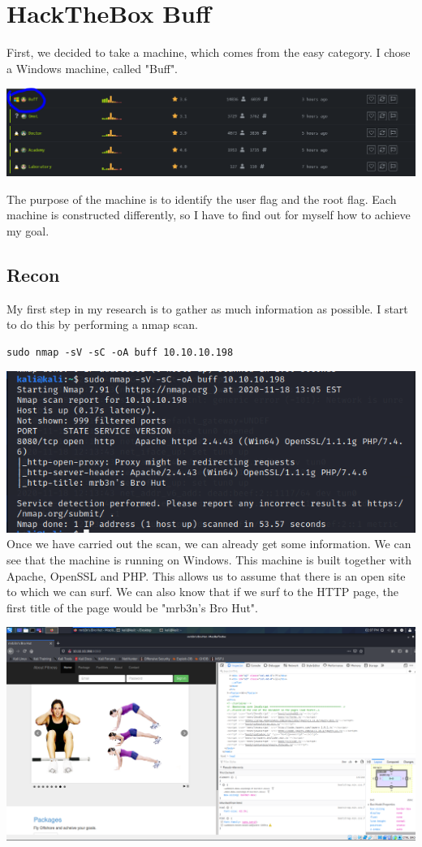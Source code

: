 \documentclass[../main.tex]{subfiles}
\begin{document}
\section{HackTheBox Buff}

First, we decided to take a machine, which comes from the easy category. I chose a Windows machine, called "Buff". 

\includegraphics[width=\linewidth]{images/Boyan/HackTheBox_1_Boyan.PNG}

The purpose of the machine is to identify the user flag and the root flag. Each machine is constructed differently, so I have to find out for myself how to achieve my goal.  

\subsection{Recon}
My first step in my research is to gather as much information as possible. I start to do this by performing a nmap scan. 

\begin{lstlisting}
sudo nmap -sV -sC -oA buff 10.10.10.198
\end{lstlisting}

\includegraphics[width=\linewidth]{images/Boyan/HackTheBox_2_scanning_Boyan.PNG}
Once we have carried out the scan, we can already get some information. We can see that the machine is running on Windows. This machine is built together with Apache, OpenSSL and PHP. This allows us to assume that there is an open site to which we can surf. We can also know that if we surf to the HTTP page, the first title of the page would be "mrb3n's Bro Hut".

\includegraphics[width=\linewidth]{images/Boyan/HackTheBox_3_Boyan.png}
\end{document}
